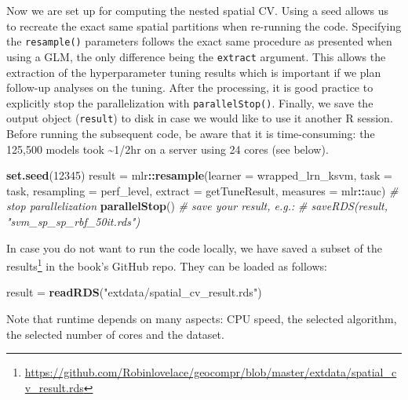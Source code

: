 \documentclass[]{krantz}
\newenvironment{Shaded}{\begin{snugshade}}{\end{snugshade}}
\newcommand{\CommentTok}[1]{\textcolor[rgb]{0.37,0.37,0.37}{\textit{#1}}}
\newcommand{\DataTypeTok}[1]{\textcolor[rgb]{0.27,0.27,0.27}{#1}}
\newcommand{\DecValTok}[1]{\textcolor[rgb]{0.06,0.06,0.06}{#1}}
\newcommand{\KeywordTok}[1]{\textcolor[rgb]{0.27,0.27,0.27}{\textbf{#1}}}
\newcommand{\NormalTok}[1]{#1}
\newcommand{\OperatorTok}[1]{\textcolor[rgb]{0.43,0.43,0.43}{\textbf{#1}}}
\newcommand{\StringTok}[1]{\textcolor[rgb]{0.5,0.5,0.5}{#1}}
\let\rmarkdownfootnote\footnote%
\def\footnote{\protect\rmarkdownfootnote}
\renewcommand{\href}[2]{#2\footnote{\url{#1}}}
\begin{document}
Now we are set up for computing the nested spatial CV.
Using a seed allows us to recreate the exact same spatial partitions when re-running the code.
Specifying the \texttt{resample()} parameters follows the exact same procedure as presented when using a GLM, the only difference being the \texttt{extract} argument.
This allows the extraction of the hyperparameter tuning results which is important if we plan follow-up analyses on the tuning.
After the processing, it is good practice to explicitly stop the parallelization with \texttt{parallelStop()}.
Finally, we save the output object (\texttt{result}) to disk in case we would like to use it another R session.
Before running the subsequent code, be aware that it is time-consuming:
the 125,500 models took \textasciitilde{}1/2hr on a server using 24 cores (see below).

\begin{Shaded}
\begin{Highlighting}[]
\KeywordTok{set.seed}\NormalTok{(}\DecValTok{12345}\NormalTok{)}
\NormalTok{result =}\StringTok{ }\NormalTok{mlr}\OperatorTok{::}\KeywordTok{resample}\NormalTok{(}\DataTypeTok{learner =}\NormalTok{ wrapped_lrn_ksvm, }
                       \DataTypeTok{task =}\NormalTok{ task,}
                       \DataTypeTok{resampling =}\NormalTok{ perf_level,}
                       \DataTypeTok{extract =}\NormalTok{ getTuneResult,}
                       \DataTypeTok{measures =}\NormalTok{ mlr}\OperatorTok{::}\NormalTok{auc)}
\CommentTok{# stop parallelization}
\KeywordTok{parallelStop}\NormalTok{()}
\CommentTok{# save your result, e.g.:}
\CommentTok{# saveRDS(result, "svm_sp_sp_rbf_50it.rds")}
\end{Highlighting}
\end{Shaded}

In case you do not want to run the code locally, we have saved a subset of the \href{https://github.com/Robinlovelace/geocompr/blob/master/extdata/spatial_cv_result.rds}{results} in the book's GitHub repo.
They can be loaded as follows:

\begin{Shaded}
\begin{Highlighting}[]
\NormalTok{result =}\StringTok{ }\KeywordTok{readRDS}\NormalTok{(}\StringTok{"extdata/spatial_cv_result.rds"}\NormalTok{)}
\end{Highlighting}
\end{Shaded}

Note that runtime depends on many aspects: CPU speed, the selected algorithm, the selected number of cores and the dataset.
\end{document}

